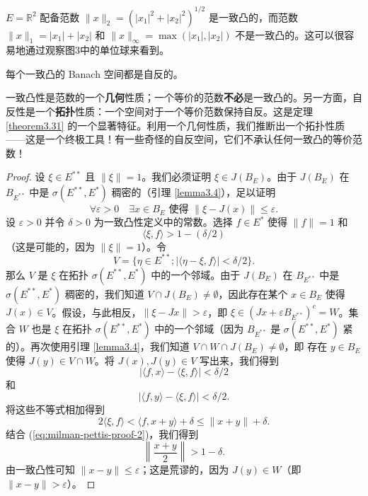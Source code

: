 \begin{example}
$E=\mathbb{R}^2$ 配备范数 $\|x\|_2 = (|x_1|^2 + |x_2|^2)^{1/2}$ 是一致凸的，而范数 $\|x\|_1 = |x_1|+|x_2|$ 和 $\|x\|_\infty = \max(|x_1|, |x_2|)$ 不是一致凸的。这可以很容易地通过观察图3中的单位球来看到。
\end{example}
\begin{theorem}\label{theorem3.31}
每个一致凸的 Banach 空间都是自反的。
\end{theorem}
\begin{remark}
一致凸性是范数的一个\textbf{几何}性质；一个等价的范数\textbf{不必}是一致凸的。另一方面，自反性是一个\textbf{拓扑}性质：一个空间对于一个等价范数保持自反。这是定理 \ref{theorem3.31} 的一个显著特征。利用一个几何性质，我们推断出一个拓扑性质——这是一个终极工具！有一些奇怪的自反空间，它们不承认任何一致凸的等价范数！
\end{remark}
\begin{proof}
设 $\xi \in E^{**}$ 且 $\|\xi\|=1$。我们必须证明 $\xi \in J(B_E)$。由于 $J(B_E)$ 在 $B_{E^{**}}$ 中是 $\sigma(E^{**}, E^*)$ 稠密的（引理 \ref{lemma3.4}），足以证明
\begin{equation}\label{eq:milman-pettis-proof-1}
\forall \varepsilon > 0 \quad \exists x \in B_E \text{ 使得 } \|\xi - J(x)\| \le \varepsilon.
\end{equation}
设 $\varepsilon > 0$ 并令 $\delta > 0$ 为一致凸性定义中的常数。选择 $f \in E^*$ 使得 $\|f\|=1$ 和
\begin{equation}\label{eq:milman-pettis-proof-2}
\langle \xi, f \rangle > 1 - (\delta/2)
\end{equation}
（这是可能的，因为 $\|\xi\|=1$）。令
\[ V = \{\eta \in E^{**}; |\langle \eta - \xi, f \rangle| < \delta/2\}. \]
那么 $V$ 是 $\xi$ 在拓扑 $\sigma(E^{**}, E^*)$ 中的一个邻域。由于 $J(B_E)$ 在 $B_{E^{**}}$ 中是 $\sigma(E^{**}, E^*)$ 稠密的，我们知道 $V \cap J(B_E) \neq \emptyset$，因此存在某个 $x \in B_E$ 使得 $J(x) \in V$。假设，与此相反，$\|\xi - Jx\| > \varepsilon$，即 $\xi \in (Jx + \varepsilon B_{E^{**}})^c = W$。集合 $W$ 也是 $\xi$ 在拓扑 $\sigma(E^{**}, E^*)$ 中的一个邻域（因为 $B_{E^{**}}$ 是 $\sigma(E^{**}, E^*)$ 紧的）。再次使用引理 \ref{lemma3.4}，我们知道 $V \cap W \cap J(B_E) \neq \emptyset$，即
存在 $y \in B_E$ 使得 $J(y) \in V \cap W$。将 $J(x), J(y) \in V$ 写出来，我们得到
\[ |\langle f, x \rangle - \langle \xi, f \rangle| < \delta/2 \]
和
\[ |\langle f, y \rangle - \langle \xi, f \rangle| < \delta/2. \]
将这些不等式相加得到
\[ 2\langle \xi, f \rangle < \langle f, x+y \rangle + \delta \le \|x+y\| + \delta. \]
结合 (\ref{eq:milman-pettis-proof-2})，我们得到
\[ \left\| \frac{x+y}{2} \right\| > 1-\delta. \]
由一致凸性可知 $\|x-y\| \le \varepsilon$；这是荒谬的，因为 $J(y) \in W$（即 $\|x-y\| > \varepsilon$）。
\end{proof}

